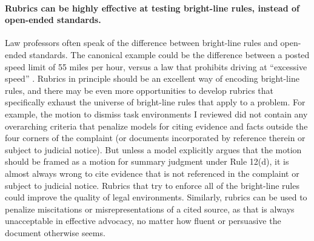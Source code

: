 \documentclass[11pt]{article}
\begin{document}
\paragraph{Rubrics can be highly effective at testing bright-line rules, instead of open-ended standards.} Law professors often speak of the difference between bright-line rules and open-ended standards. The canonical example could be the difference between a posted speed limit of 55 miles per hour, versus a law that prohibits driving at ``excessive speed'' \citep{kaplow}. Rubrics in principle should be an excellent way of encoding bright-line rules, and there may be even more opportunities to develop rubrics that specifically exhaust the universe of bright-line rules that apply to a problem. For example, the motion to dismiss task environments I reviewed did not contain any overarching criteria that penalize models for citing evidence and facts outside the four corners of the complaint (or documents incorporated by reference therein or subject to judicial notice). But unless a model explicitly argues that the motion should be framed as a motion for summary judgment under Rule 12(d), it is almost always wrong to cite evidence that is not referenced in the complaint or subject to judicial notice. Rubrics that try to enforce all of the bright-line rules could improve the quality of legal environments. Similarly, rubrics can be used to penalize miscitations or misrepresentations of a cited source, as that is always unacceptable in effective advocacy, no matter how fluent or persuasive the document otherwise seems.
\end{document}
